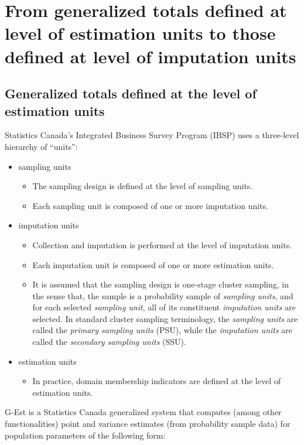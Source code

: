 

\section{From generalized totals defined at level of estimation units to those defined at level of imputation units}
\label{GEstToOneStageClusterSampling}


\subsection{Generalized totals defined at the level of estimation units}
\label{Whatever}
\setcounter{theorem}{0}


Statistics Canada's Integrated Business Survey Program (IBSP)
uses a three-level hierarchy of ``units'':
\begin{itemize}
\item
    sampling units
    \begin{itemize}
    \item
        The sampling design is defined at the level of sampling units.
    \item
        Each sampling unit is composed of one or more imputation units.
    \end{itemize}
\item
    imputation units
    \begin{itemize}
    \item
        Collection and imputation is performed at the level of imputation units.
    \item
        Each imputation unit is composed of one or more estimation units.
    \item
        It is assumed that the sampling design is {\color{red}one-stage cluster sampling},
        in the sense that, the sample is a probability sample of \textit{sampling units}, and
        for each selected \textit{sampling unit},
        all of its constituent \textit{imputation units} are selected.
        In standard cluster sampling terminology,
        the \textit{sampling units} are called the \textit{primary sampling units} (PSU),
        while the \textit{imputation units} are called the \textit{secondary sampling units} (SSU).
    \end{itemize}
\item
    estimation units
    \begin{itemize}
    \item
        In practice, {\color{red}domain membership indicators} are defined
        at the level of estimation units.
    \end{itemize}
\end{itemize}
G-Est is a Statistics Canada generalized system that computes (among other functionalities)
point and variance estimates (from probability sample data) for population parameters of the following form:

